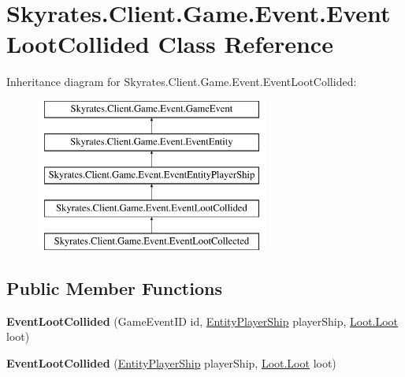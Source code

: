 \hypertarget{class_skyrates_1_1_client_1_1_game_1_1_event_1_1_event_loot_collided}{\section{Skyrates.\-Client.\-Game.\-Event.\-Event\-Loot\-Collided Class Reference}
\label{class_skyrates_1_1_client_1_1_game_1_1_event_1_1_event_loot_collided}
}
Inheritance diagram for Skyrates.\-Client.\-Game.\-Event.\-Event\-Loot\-Collided\-:\begin{figure}[H]
\begin{center}
\leavevmode
\includegraphics[height=5.000000cm]{class_skyrates_1_1_client_1_1_game_1_1_event_1_1_event_loot_collided}
\end{center}
\end{figure}
\subsection*{Public Member Functions}
\begin{DoxyCompactItemize}
\item 
\hypertarget{class_skyrates_1_1_client_1_1_game_1_1_event_1_1_event_loot_collided_ae70f0ee848faf45446a663c046ec1a82}{{\bfseries Event\-Loot\-Collided} (Game\-Event\-I\-D id, \hyperlink{class_skyrates_1_1_client_1_1_entity_player_ship}{Entity\-Player\-Ship} player\-Ship, \hyperlink{class_skyrates_1_1_client_1_1_loot_1_1_loot}{Loot.\-Loot} loot)}\label{class_skyrates_1_1_client_1_1_game_1_1_event_1_1_event_loot_collided_ae70f0ee848faf45446a663c046ec1a82}

\item 
\hypertarget{class_skyrates_1_1_client_1_1_game_1_1_event_1_1_event_loot_collided_a85362a7ef6660125858f8d6a79a6288e}{{\bfseries Event\-Loot\-Collided} (\hyperlink{class_skyrates_1_1_client_1_1_entity_player_ship}{Entity\-Player\-Ship} player\-Ship, \hyperlink{class_skyrates_1_1_client_1_1_loot_1_1_loot}{Loot.\-Loot} loot)}\label{class_skyrates_1_1_client_1_1_game_1_1_event_1_1_event_loot_collided_a85362a7ef6660125858f8d6a79a6288e}

\end{DoxyCompactItemize}
